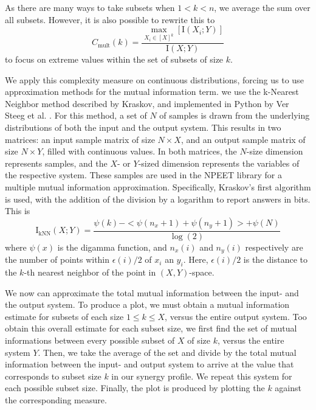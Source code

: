 \documentclass[../main.tex]{subfiles}
\begin{document}
As there are many ways to take subsets when $1 < k < n$, we average the sum over all subsets.
However, it is also possible to rewrite this to
%
\begin{equation}
C_\mathrm{mult}(k) = \frac{\max_{X_i \in [X]^k} [\mathrm{I}(X_i;Y)]}{\mathrm{I}(X;Y)}
\end{equation}
%
to focus on extreme values within the set of subsets of size $k$.

We apply this complexity measure on continuous distributions, forcing us to use approximation methods for the mutual information term.
we use the k-Nearest Neighbor method described by Kraskov, and implemented in Python by Ver Steeg et al. \cite{kraskov2004estimating, versteeg2013NPEET}.
For this method, a set of $N$ of samples is drawn from the underlying distributions of both the input and the output system.
This results in two matrices: an input sample matrix of size $N \times X$, and an output sample matrix of size $N \times Y$, filled with continuous values.
In both matrices, the $N$-size dimension represents samples, and the $X$- or $Y$-sized dimension represents the variables of the respective system.
These samples are used in the NPEET library for a multiple mutual information approximation.
Specifically, Kraskov's first algorithm is used, with the addition of the division by a logarithm to report answers in bits.
This is
%
\begin{equation}
\mathrm{I}_\mathrm{kNN}(X;Y) = \frac{\psi(k) - < \psi(n_x + 1) + \psi(n_y + 1) > + \psi(N)}{\log(2)}
\end{equation}
%
where $\psi(x)$ is the digamma function, and $n_x(i)$ and $n_y(i)$ respectively are the number of points within $\epsilon(i)/2$ of $x_i$ an $y_i$. Here, $\epsilon(i)/2$ is the distance to the $k$-th nearest neighbor of the point in $(X,Y)$-space.

We now can approximate the total mutual information between the input- and the output system.
To produce a plot, we must obtain a mutual information estimate for subsets of each size $1 \le k \le X$, versus the entire output system.
Too obtain this overall estimate for each subset size, we first find the set of mutual informations between every possible subset of $X$ of size $k$, versus the entire system $Y$.
Then, we take the average of the set and divide by the total mutual information between the input- and output system to arrive at the value that corresponds to subset size $k$ in our synergy profile.
We repeat this system for each possible subset size.
Finally, the plot is produced by plotting the $k$ against the corresponding measure.
\end{document}

